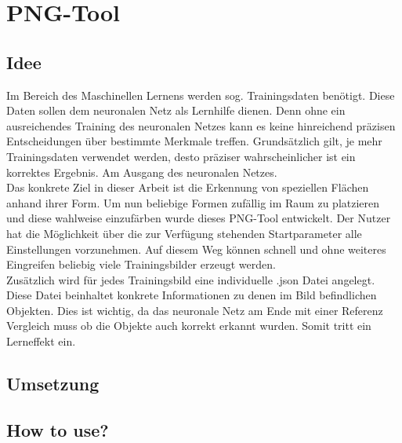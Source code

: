 
\section{PNG-Tool}

\subsection{Idee}

Im Bereich des Maschinellen Lernens werden sog. Trainingsdaten benötigt. Diese Daten sollen dem neuronalen Netz als Lernhilfe dienen. Denn ohne ein ausreichendes Training des neuronalen Netzes kann es keine hinreichend präzisen Entscheidungen über bestimmte Merkmale treffen.
Grundsätzlich gilt, je mehr Trainingsdaten verwendet werden, desto präziser wahrscheinlicher ist ein korrektes Ergebnis. Am Ausgang des neuronalen Netzes. \\

Das konkrete Ziel in dieser Arbeit ist die Erkennung von speziellen Flächen anhand ihrer Form. Um nun beliebige Formen zufällig im Raum zu platzieren und diese wahlweise einzufärben wurde dieses PNG-Tool entwickelt. Der Nutzer hat die Möglichkeit über die zur Verfügung stehenden Startparameter alle Einstellungen vorzunehmen. Auf diesem Weg können schnell und ohne weiteres Eingreifen beliebig viele Trainingsbilder erzeugt werden. \\

Zusätzlich wird für jedes Trainingsbild eine individuelle .json Datei angelegt. Diese Datei beinhaltet konkrete Informationen zu denen im Bild befindlichen Objekten. Dies ist wichtig, da das neuronale Netz am Ende mit einer Referenz Vergleich muss ob die Objekte auch korrekt erkannt wurden. Somit tritt ein Lerneffekt ein.  
\newpage

\subsection{Umsetzung}



\newpage

\subsection{How to use?}

